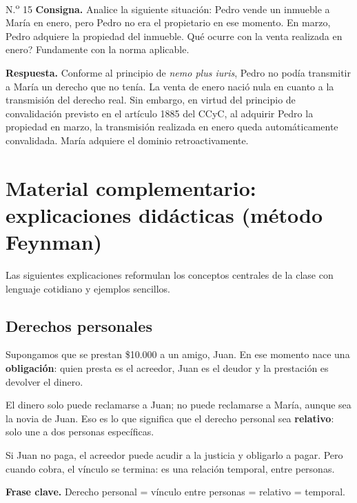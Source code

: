 \documentclass[12pt,oneside]{book}
\begin{document}
\begin{exercise}{N.\textsuperscript{o} 15}
\textbf{Consigna.} Analice la siguiente situaci\'on: Pedro vende un inmueble a Mar\'ia en enero, pero Pedro no era el propietario en ese momento. En marzo, Pedro adquiere la propiedad del inmueble. \textquestiondown Qu\'e ocurre con la venta realizada en enero? Fundamente con la norma aplicable.

\textbf{Respuesta.} Conforme al principio de \textit{nemo plus iuris}, Pedro no pod\'ia transmitir a Mar\'ia un derecho que no ten\'ia. La venta de enero naci\'o nula en cuanto a la transmisi\'on del derecho real. Sin embargo, en virtud del principio de convalidaci\'on previsto en el art\'iculo 1885 del CCyC, al adquirir Pedro la propiedad en marzo, la transmisi\'on realizada en enero queda autom\'aticamente convalidada. Mar\'ia adquiere el dominio retroactivamente.
\end{exercise}

\chapter[Material complementario: m\'etodo Feynman]{Material complementario: explicaciones did\'acticas (m\'etodo Feynman)}

Las siguientes explicaciones reformulan los conceptos centrales de la clase con lenguaje cotidiano y ejemplos sencillos.

\section{Derechos personales}

Supongamos que se prestan \$10.000 a un amigo, Juan. En ese momento nace una \textbf{obligaci\'on}: quien presta es el acreedor, Juan es el deudor y la prestaci\'on es devolver el dinero.

El dinero solo puede reclamarse a Juan; no puede reclamarse a Mar\'ia, aunque sea la novia de Juan. Eso es lo que significa que el derecho personal sea \textbf{relativo}: solo une a dos personas espec\'ificas.

Si Juan no paga, el acreedor puede acudir a la justicia y obligarlo a pagar. Pero cuando cobra, el v\'inculo se termina: es una relaci\'on temporal, entre personas.

\begin{note}
\textbf{Frase clave.} Derecho personal = v\'inculo entre personas = relativo = temporal.
\end{note}
\end{document}
